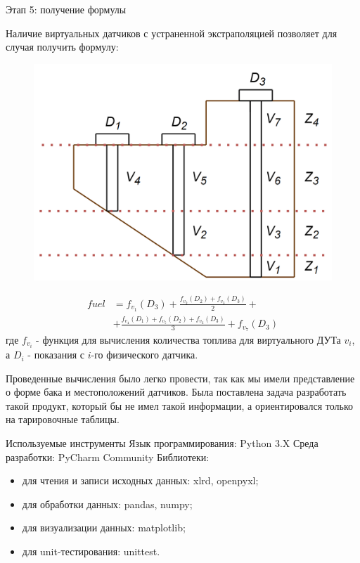 \documentclass[usenames,dvipsnames,11pt]{beamer}
\begin{document}
\begin{frame}{Этап 5: получение формулы}
	
	\begin{minipage}[h]{0.55\linewidth}
	Наличие виртуальных датчиков с устраненной экстраполяцией позволяет для случая получить формулу:
	\end{minipage}
	\hfill
	\begin{minipage}[h]{0.4\linewidth}
		\begin{figure}
				\centering
				\includegraphics[width=1\linewidth]{graphics/screenshot008}
			\end{figure}
	\end{minipage}
	
	\begin{align*}
	    fuel &= f_{v_1}(D_3)+\frac{f_{v_2}(D_2)+f_{v_3}(D_3)}{2} +  \\        
	         &+ \frac{f_{v_4}(D_1)+f_{v_5} (D_2)+f_{v_6}(D_3)}{3}+f_{v_7}(D_3)
	\end{align*}
	где $f_{v_i}$ - функция для вычисления количества топлива для виртуального ДУТа ${v_i}$, а $D_i$ - показания с $i$-го физического датчика.
\end{frame}

\begin{frame}
	Проведенные вычисления было легко провести, так как мы имели представление о форме бака и местоположений датчиков.
	\bigbreak
	Была поставлена задача разработать такой продукт, который бы не имел такой информации, а ориентировался только на тарировочные таблицы.
\end{frame}

\begin{frame}{Используемые инструменты}
	Язык программирования: Python 3.X
	\bigbreak
	Среда разработки: PyCharm Community
	\bigbreak
	Библиотеки:
	\begin{itemize}
		\item для чтения и записи исходных данных: xlrd, openpyxl;
		\item для обработки данных: pandas, numpy;
		\item для визуализации данных: matplotlib;
		\item для unit-тестирования: unittest.
	\end{itemize}
\end{frame}	
\end{document}
